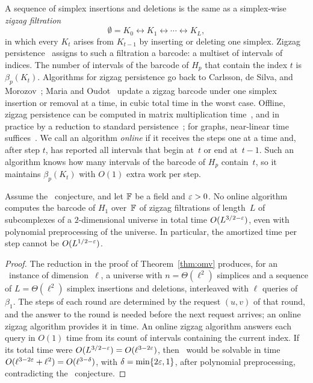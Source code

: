 A sequence of simplex insertions and deletions is the same as a simplex-wise \emph{zigzag filtration}
\[
  \emptyset=K_0\leftrightarrow K_1\leftrightarrow\cdots\leftrightarrow K_L,
\]
in which every $K_t$ arises from $K_{t-1}$ by inserting or deleting one simplex.
Zigzag persistence~\cite{CdS10} assigns to such a filtration a barcode: a multiset of intervals of indices.
The number of intervals of the barcode of $H_p$ that contain the index $t$ is $\beta_p(K_t)$.
Algorithms for zigzag persistence go back to Carlsson, de Silva, and Morozov~\cite{CdSM09}; Maria and Oudot~\cite{MO15} update a zigzag barcode under one simplex insertion or removal at a time, in cubic total time in the worst case.
Offline, zigzag persistence can be computed in matrix multiplication time~\cite{MMS11}, and in practice by a reduction to standard persistence~\cite{DH22}; for graphs, near-linear time suffices~\cite{DH21z,DHP23}.
We call an algorithm \emph{online} if it receives the steps one at a time and, after step $t$, has reported all intervals that begin at~$t$ or end at~$t-1$.
Such an algorithm knows how many intervals of the barcode of $H_p$ contain~$t$, so it maintains $\beta_p(K_t)$ with $O(1)$ extra work per step.

\begin{corollary}\label{cor:zigzag}
Assume the \OMv\ conjecture, and let $\mathbb{F}$ be a field and $\varepsilon>0$.
No online algorithm computes the barcode of $H_1$ over~$\mathbb{F}$ of zigzag filtrations of length~$L$ of subcomplexes of a $2$-dimensional universe in total time $O(L^{3/2-\varepsilon})$, even with polynomial preprocessing of the universe.
In particular, the amortized time per step cannot be $O(L^{1/2-\varepsilon})$.
\end{corollary}

\begin{proof}
The reduction in the proof of Theorem~\ref{thm:omv} produces, for an \OuMv\ instance of dimension~$\ell$, a universe with $n=\Theta(\ell^2)$ simplices and a sequence of $L=\Theta(\ell^2)$ simplex insertions and deletions, interleaved with $\ell$ queries of $\beta_1$.
The steps of each round are determined by the request $(u,v)$ of that round, and the answer to the round is needed before the next request arrives; an online zigzag algorithm provides it in time.
An online zigzag algorithm answers each query in $O(1)$ time from its count of intervals containing the current index.
If its total time were $O(L^{3/2-\varepsilon})=O(\ell^{3-2\varepsilon})$, then \OuMv\ would be solvable in time $O(\ell^{3-2\varepsilon}+\ell^2)=O(\ell^{3-\delta})$, with $\delta=\min\{2\varepsilon,1\}$, after polynomial preprocessing, contradicting the \OMv\ conjecture.
\end{proof}

